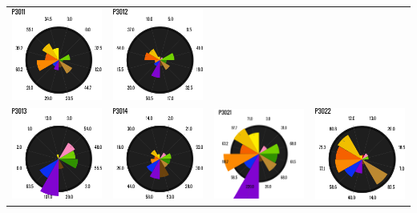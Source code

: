 \begin{table}[htbp]
\begin{tabular}{p{1.25in}p{1.25in}p{1.25in}p{1.25in}}
\includegraphics[width=1.25in]{./images/cont4/polar_charts/p3011}&
\includegraphics[width=1.25in]{./images/cont4/polar_charts/p3012}\\
\includegraphics[width=1.25in]{./images/cont4/polar_charts/p3013}&
\includegraphics[width=1.25in]{./images/cont4/polar_charts/p3014}&
\includegraphics[width=1.25in]{./images/cont4/polar_charts/p3021}&
\includegraphics[width=1.25in]{./images/cont4/polar_charts/p3022}\\

\end{tabular}
\end{table}
